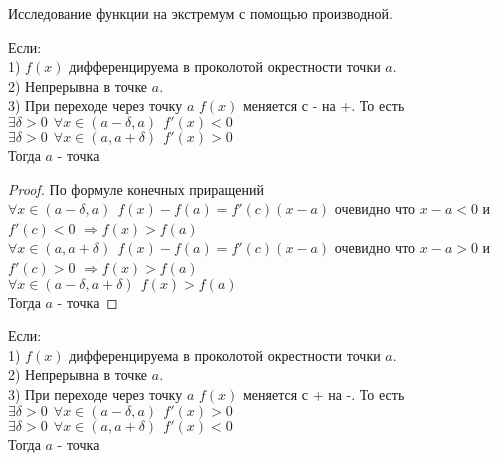 \begin{title}[\Large]
  Исследование функции на экстремум с помощью производной.
\end{title}

\begin{block}
  Если: \\
    1) $f(x)$ дифференцируема в проколотой окрестности точки $a$.\\
    2) Непрерывна в точке $a$.\\
    3) При переходе через точку $a$ $f(x)$ меняется с - на +. То есть\\
      $\exists \delta > 0 ~~ \forall x \in (a - \delta, a) ~~ f'(x) < 0$\\
      $\exists \delta > 0 ~~ \forall x \in (a, a + \delta) ~~ f'(x) > 0$\\
  Тогда $a$ - точка 
\end{block}

\begin{proof}
  По формуле конечных приращений\\
  $\forall x \in (a - \delta, a) ~~ f(x) - f(a) = f'(c)(x - a)$ очевидно что
  $x - a < 0$ и \\ $f'(c) < 0$ $\Rightarrow f(x) > f(a)$\\
  $\forall x \in (a, a + \delta) ~~ f(x) - f(a) = f'(c)(x - a)$ очевидно что
  $x - a > 0$ и \\ $f'(c) > 0$ $\Rightarrow f(x) > f(a)$\\
  $\forall x \in (a - \delta, a+ \delta) ~~ f(x) > f(a)$\\
  Тогда $a$ - точка 
\end{proof}

\begin{block}
  Если: \\
    1) $f(x)$ дифференцируема в проколотой окрестности точки $a$.\\
    2) Непрерывна в точке $a$.\\
    3) При переходе через точку $a$ $f(x)$ меняется с + на -. То есть\\
      $\exists \delta > 0 ~~ \forall x \in (a - \delta, a) ~~ f'(x) > 0$\\
      $\exists \delta > 0 ~~ \forall x \in (a, a + \delta) ~~ f'(x) < 0$\\
  Тогда $a$ - точка 
\end{block}

